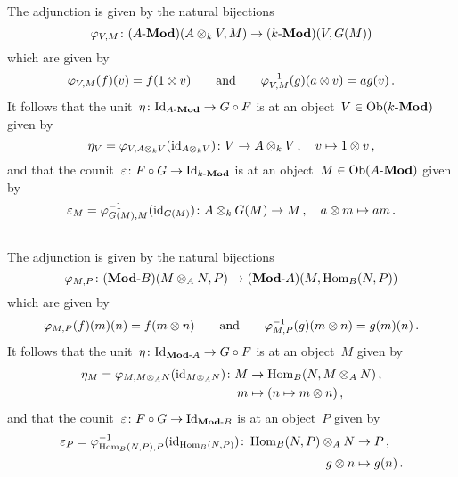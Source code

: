 \section{}





\subsection{}

The adjunction is given by the natural bijections
\[
          \varphi_{V,M}
  \colon  (\text{$A$-$\mathbf{Mod}$})(A \otimes_k V, M)
  \to     (\text{$k$-$\mathbf{Mod}$})(V, G(M))
\]
which are given by
\[
    \varphi_{V,M}(f)(v)
  = f(1 \otimes v)
  \qquad\text{and}\qquad
    \varphi_{V,M}^{-1}(g)(a \otimes v)
  = a g(v) \,.
\]
It follows that the unit~$\eta \colon \mathrm{Id}_{\text{$A$-$\mathbf{Mod}$}} \to G \circ F$ is at an object~$V \in \operatorname{Ob}(\text{$k$-$\mathbf{Mod}$})$ given by
\[
          \eta_V
  =       \varphi_{V, A \otimes_k V}( \operatorname{id}_{A \otimes_k V} )
  \colon  V
  \to     A \otimes_k V \,,
  \quad   v
  \mapsto 1 \otimes v \,,
\]
and that the counit~$\varepsilon \colon F \circ G \to \mathrm{Id}_{\text{$k$-$\mathbf{Mod}$}}$ is at an object~$M \in \operatorname{Ob}(\text{$A$-$\mathbf{Mod}$})$ given by
\[
            \varepsilon_M
  =         \varphi_{G(M),M}^{-1}( \operatorname{id}_{G(M)} )
  \colon    A \otimes_k G(M)
  \to       M \,,
  \quad     a \otimes m
  \mapsto   a m \,.
\]




\subsection{}

The adjunction is given by the natural bijections
\[
          \varphi_{M,P}
  \colon  (\text{$\mathbf{Mod}$-$B$})(M \otimes_A N, P)
  \to     (\text{$\mathbf{Mod}$-$A$})(M, \operatorname{Hom}_B(N, P))
\]
which are given by
\[
    \varphi_{M,P}(f)(m)(n)
  = f(m \otimes n)
  \qquad\text{and}\qquad
    \varphi_{M,P}^{-1}(g)(m \otimes n)
  = g(m)(n) \,.
\]
It follows that the unit~$\eta \colon \mathrm{Id}_{\text{$\mathbf{Mod}$-$A$}} \to G \circ F$ is at an object~$M$ given by
\begin{align*}
            \eta_M
   =        \varphi_{M, M \otimes_A N}( \operatorname{id}_{M \otimes_A N} )
   \colon   M
  &\to      \operatorname{Hom}_B(N, M \otimes_A N) \,,
  \\
            m
  &\mapsto  (n \mapsto m \otimes n) \,,
\end{align*}
and that the counit~$\varepsilon \colon F \circ G \to \mathrm{Id}_{\text{$\mathbf{Mod}$-$B$}}$ is at an object~$P$ given by
\begin{align*}
            \varepsilon_P
   =        \varphi_{\operatorname{Hom}_B(N,P), P}^{-1}( \operatorname{id}_{\operatorname{Hom}_B(N,P)} )
   \colon   \operatorname{Hom}_B(N, P) \otimes_A N
  &\to      P \,,
    \\       
            g \otimes n
  &\mapsto  g(n) \,.
\end{align*}





